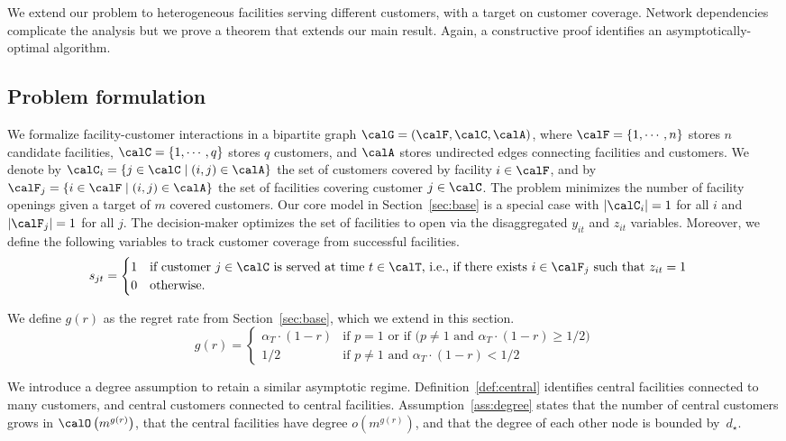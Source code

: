 \documentclass[blindrev]{informs3noheader}
\begin{document}
We extend our problem to heterogeneous facilities serving different customers, with a target on customer coverage. Network dependencies complicate the analysis but we prove a theorem that extends our main result. Again, a constructive proof identifies an asymptotically-optimal algorithm.

\subsection{Problem formulation}
\label{subsec:network_problem}

We formalize facility-customer interactions in a bipartite graph $\calG=(\calF,\calC, \calA)$, where $\calF=\{1, \cdots, n\}$ stores $n$ candidate facilities, $\calC=\{1, \cdots, q\}$ stores $q$ customers, and $\calA$ stores undirected edges connecting facilities and customers. We denote by $\calC_i=\left\{j\in\calC\mid(i,j)\in\calA\right\}$ the set of customers covered by facility $i\in\calF$, and by $\calF_j=\left\{i\in\calF\mid(i,j)\in\calA\right\}$ the set of facilities covering customer $j\in\calC$. The problem minimizes the number of facility openings given a target of $m$ covered customers. Our core model in Section~\ref{sec:base} is a special case with $|\calC_i|=1$ for all $i$ and $|\calF_j|=1$ for all $j$. The decision-maker optimizes the set of facilities to open via the disaggregated $y_{it}$ and $z_{it}$ variables. Moreover, we define the following variables to track customer coverage from successful facilities.
\begin{align*}
s_{jt}&=\begin{cases}
    1&\text{if customer $j \in \calC$ is served at time $t\in\calT$, i.e., if there exists $i\in\calF_j$ such that $z_{it}=1$}\\
    0&\text{otherwise.}
\end{cases}
\end{align*}

We define $g(r)$ as the regret rate from Section~\ref{sec:base}, which we extend in this section.
\[g(r) = \begin{cases}
\alpha_T\cdot (1-r) & \text{if $p=1$ or if ($p\neq1$ and $\alpha_T\cdot(1-r)\geq1/2$)}\\
1/2 & \text{if $p\neq1$ and $\alpha_T\cdot(1-r)<1/2$}
\end{cases}\] 

We introduce a degree assumption to retain a similar asymptotic regime. Definition~\ref{def:central} identifies central facilities connected to many customers, and central customers connected to central facilities. Assumption~\ref{ass:degree} states that the number of central customers grows in $\calO\left(m^{g(r)}\right)$, that the central facilities have degree $o\left(m^{g(r)}\right)$, and that the degree of each other node is bounded by~$d_\star$.
\end{document}
